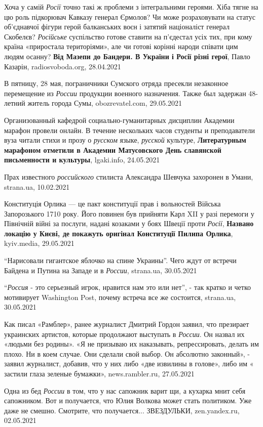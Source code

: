 Хоча у самій \emph{Росії} точно такі ж проблеми з інтегральними героями. Хіба
тягне на цю роль підкорювач Кавказу генерал Єрмолов? Чи може розраховувати на
статус об'єднавчої фігури герой балканських воєн і затятий націоналіст генерал
Скобелєв? \emph{Російське} суспільство готове ставити на п'єдестал усіх тих,
при кому країна «приростала територіями», але чи готові корінні народи співати
цим людям осанну? \textbf{Від Мазепи до Бандери. В України і Росії різні
герої}, Павло Казарін, radiosvoboda.org, 28.04.2021

В пятницу, 28 мая, пограничники Сумского отряда пресекли незаконное перемещение
из \emph{России} продукции военного назначения. Также был задержан 48-летний житель
города Сумы, obozrevatel.com, 29.05.2021

Организованный кафедрой социально-гуманитарных дисциплин Академии марафон
провели онлайн. В течение нескольких часов студенты и преподаватели вуза читали
стихи и прозу о \emph{русском} языке, \emph{русской} культуре,
\textbf{Литературным марафоном отметили в Академии Матусовского День славянской
письменности и культуры}, lgaki.info, 24.05.2021

Прах известного \emph{российского} стилиста Александра Шевчука захоронен в
Умани, strana.ua, 10.02.2021

Конституція Орлика — це пакт конституції прав і вольностей Війська Запорозького
1710 року. Його повинен був прийняти Карл XII у разі перемоги у Північній війні
за послуги, надані козаками у боях Швеції проти \emph{Росії}, \textbf{Названо
локацію у Києві, де покажуть оригінал Конституції Пилипа Орлика}, kyiv.media,
29.05.2021

\enquote{Нарисовали гигантское яблочко на спине Украины}. Чего ждут от встречи
Байдена и Путина на Западе и в \emph{России}, strana.ua, 30.05.2021

\enquote{\emph{Россия} - это серьезный игрок, нравится нам это или нет}, - так
кратко и четко мотивирует Washington Post, почему встреча все же состоится,
strana.ua, 30.05.2021

Как писал «Рамблер», ранее журналист Дмитрий Гордон заявил, что презирает
украинских артистов, которые продолжают выступать в \emph{России}. Он назвал их
«людьми без родины».  «Я не призываю их наказывать, репрессировать, делать им
плохо. Ни в коем случае. Они сделали свой выбор. Он абсолютно законный», -
заявил журналист, добавив, что у них либо «две извилины в голове», либо им «
застили глаза зеленые бумажки», news.rambler.ru, 27.05.2021

Одна из бед \emph{России} в том, что у нас сапожник варит щи, а кухарка мнит
себя сапожником. Вот и получается, что Юлия Волкова может стать политиком. Уже
даже не смешно. Смотрите, что получается... ЗВЕЗДУЛЬКИ, zen.yandex.ru,
02.05.2021

